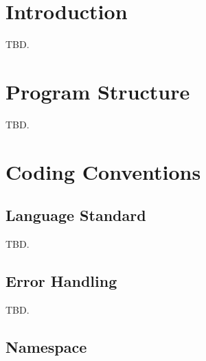 % 

\chapter{Introduction}


TBD.

\chapter{Program Structure}

TBD.

\chapter{Coding Conventions}

\section{Language Standard}

TBD.

\section{Error Handling}

TBD.

\section{Namespace}

